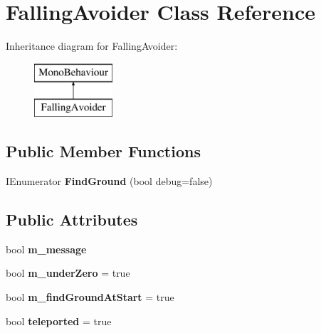 \hypertarget{class_falling_avoider}{}\section{Falling\+Avoider Class Reference}
\label{class_falling_avoider}
Inheritance diagram for Falling\+Avoider\+:\begin{figure}[H]
\begin{center}
\leavevmode
\includegraphics[height=2.000000cm]{class_falling_avoider}
\end{center}
\end{figure}
\subsection*{Public Member Functions}
\begin{DoxyCompactItemize}
\item 
\mbox{\label{class_falling_avoider_a732da8b6196fadb6c6f1a1b5d853c0c0}} 
I\+Enumerator {\bfseries Find\+Ground} (bool debug=false)
\end{DoxyCompactItemize}
\subsection*{Public Attributes}
\begin{DoxyCompactItemize}
\item 
\mbox{\label{class_falling_avoider_ae8ae1e0291ba2f7f622c94e61513d4a5}} 
bool {\bfseries m\+\_\+message}
\item 
\mbox{\label{class_falling_avoider_a993d73f587e2ce4c402e0878b93e9805}} 
bool {\bfseries m\+\_\+under\+Zero} = true
\item 
\mbox{\label{class_falling_avoider_a8b3cbdb25daa0eb1336fd607a1cd69d5}} 
bool {\bfseries m\+\_\+find\+Ground\+At\+Start} = true
\item 
\mbox{\label{class_falling_avoider_a066a8a82082a64250b2518d65328fc39}} 
bool {\bfseries teleported} = true
\end{DoxyCompactItemize}
